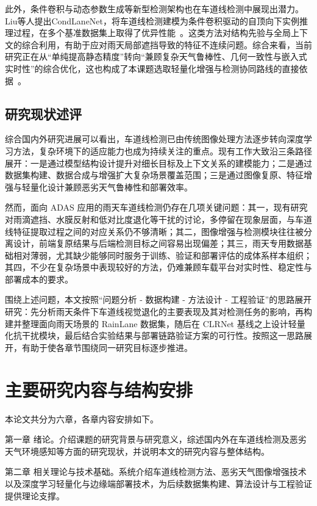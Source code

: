 此外，条件卷积与动态参数生成等新型检测架构也在车道线检测中展现出潜力。Liu等人提出CondLaneNet，将车道线检测建模为条件卷积驱动的自顶向下实例推理过程，在多个基准数据集上取得了优异性能~\cite{liu2021}。这类方法对结构先验与全局上下文的综合利用，有助于应对雨天局部遮挡导致的特征不连续问题。综合来看，当前研究正在从“单纯提高静态精度”转向“兼顾复杂天气鲁棒性、几何一致性与嵌入式实时性”的综合优化，这也构成了本课题选取轻量化增强与检测协同路线的直接依据~\cite{qin2024ultrafastv2,hou2019sad,sandler2018mobilenetv2,jacob2018quantization}。

\subsection{研究现状述评}
综合国内外研究进展可以看出，车道线检测已由传统图像处理方法逐步转向深度学习方法，复杂环境下的适应能力也成为持续关注的重点。现有工作大致沿三条路径展开：一是通过模型结构设计提升对细长目标及上下文关系的建模能力；二是通过数据集构建、数据合成与增强扩大复杂场景覆盖范围；三是通过图像复原、特征增强与轻量化设计兼顾恶劣天气鲁棒性和部署效率。

然而，面向 ADAS 应用的雨天车道线检测仍存在几项关键问题：其一，现有研究对雨滴遮挡、水膜反射和低对比度退化等干扰的讨论，多停留在现象层面，与车道线特征提取过程之间的对应关系仍不够清晰；其二，图像增强与检测模块往往被分离设计，前端复原结果与后端检测目标之间容易出现偏差；其三，雨天专用数据基础相对薄弱，尤其缺少能够同时服务于训练、验证和部署评估的成体系样本组织；其四，不少在复杂场景中表现较好的方法，仍难兼顾车载平台对实时性、稳定性与部署成本的要求。

围绕上述问题，本文按照“问题分析 - 数据构建 - 方法设计 - 工程验证”的思路展开研究：先分析雨天条件下车道线视觉退化的主要表现及其对检测任务的影响，再构建并整理面向雨天场景的 RainLane 数据集，随后在 CLRNet 基线之上设计轻量化抗干扰模块，最后结合实验结果与部署链路验证方案的可行性。按照这一思路展开，有助于使各章节围绕同一研究目标逐步推进。

\section{主要研究内容与结构安排}
\label{sec:arrangement}

本论文共分为六章，各章内容安排如下。

第一章 绪论。介绍课题的研究背景与研究意义，综述国内外在车道线检测及恶劣天气环境感知等方面的研究现状，并说明本文的研究内容与整体结构。

第二章 相关理论与技术基础。系统介绍车道线检测方法、恶劣天气图像增强技术以及深度学习轻量化与边缘端部署技术，为后续数据集构建、算法设计与工程验证提供理论支撑。


